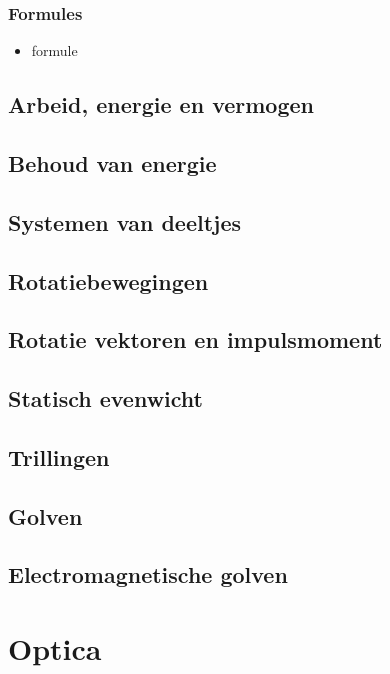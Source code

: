 \documentclass[12pt]{report}
\begin{document}
\section{Formules}
\begin{itemize}

\item formule
\end{itemize}


\chapter{Arbeid, energie en vermogen}

\chapter{Behoud van energie}

\chapter{Systemen van deeltjes}

\chapter{Rotatiebewegingen}

\chapter{Rotatie vektoren en impulsmoment}

\chapter{Statisch evenwicht}

\chapter{Trillingen}

\chapter{Golven}

\chapter{Electromagnetische golven}

\part{Optica}
\end{document}
